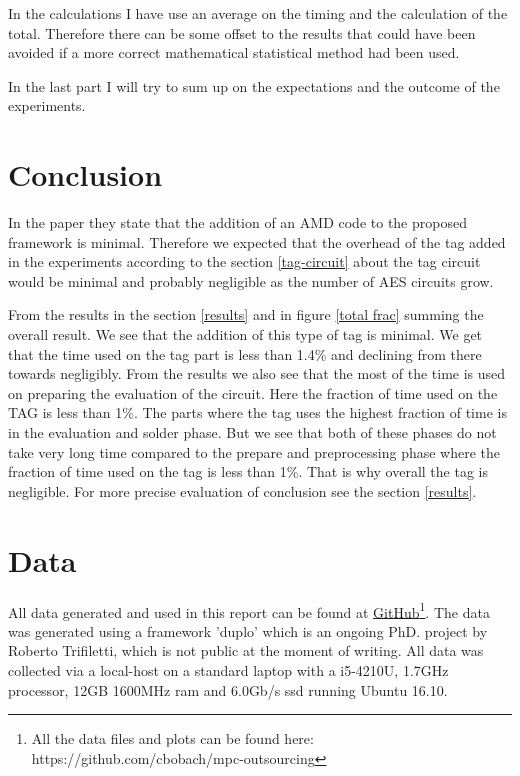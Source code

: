 \documentclass[10pt,a4paper]{article}
\newcommand{\todo}[1]{}
\renewcommand{\todo}[1]{{\color{red} TODO: {#1}} \\}
\begin{document}
In the calculations I have use an average on the timing and the calculation of the total. Therefore there can be some offset to the results that could have been avoided if a more correct mathematical statistical method had been used.

\bigskip
In the last part I will try to sum up on the expectations and the outcome of the experiments.

\section{Conclusion}
In the paper \cite{fosc} they state that the addition of an AMD code to the proposed framework is minimal. Therefore we expected that the overhead of the tag added in the experiments according to the section \ref{tag-circuit} about the tag circuit would be minimal and probably negligible as the number of AES circuits grow.

From the results in the section \ref{results} and in figure \ref{total frac} summing the overall result. We see that the addition of this type of tag is minimal. We get that the time used on the tag part is less than 1.4\% and declining from there towards negligibly. 
From the results we also see that the most of the time is used on preparing the evaluation of the circuit. Here the fraction of time used on the TAG is less than 1\%. The parts where the tag uses the highest fraction of time is in the evaluation and solder phase. But we see that both of these phases do not take very long time compared to the prepare and preprocessing phase where the fraction of time used on the tag is less than 1\%. That is why overall the tag is negligible. For more precise evaluation of conclusion see the section \ref{results}.


\pagebreak



\appendix

\section{Data}
\label{data appendix}
All data generated and used in this report can be found at \href{https://github.com/cbobach/mpc-outsourcing}{GitHub}\footnote{All the data files and plots can be found here: https://github.com/cbobach/mpc-outsourcing}. The data was generated using a framework 'duplo' which is an ongoing PhD. project by Roberto Trifiletti, which is not public at the moment of writing. All data was collected via a local-host on a standard laptop with a i5-4210U, 1.7GHz processor, 12GB 1600MHz ram and 6.0Gb/s ssd running Ubuntu 16.10.
\end{document}
